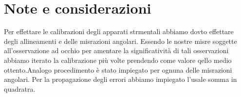 \section{Note e considerazioni}
	Per effettare le calibrazioni degli apparati strmentali
	abbiamo dovto effettare degli allineamenti e delle 
	misrazioni angolari.
	Essendo le nostre misre soggette all'osservazione ad occhio
	per amentare la significatività di tali osservazioni abbiamo
	iterato la calibrazione più volte 
	prendendo come valore qello medio ottento.Analogo procedimento è 
	stato impiegato per ognuna delle misrazioni angolari. 
	Per la propagazione degli errori abbiamo impiegato l'usale 
	somma in quadratra.
